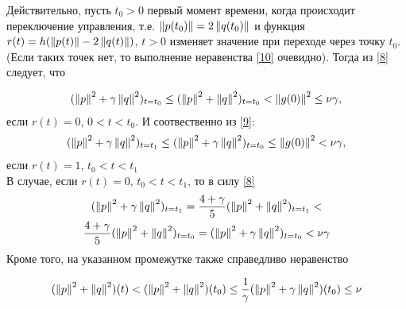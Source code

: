     Действительно, пусть $t_0 > 0$ первый момент времени, когда происходит
    переключение управления, т.е. $\left\lVert p(t_0)\right\rVert = 2\left\lVert q(t_0)\right\rVert$ и функция
    $r(t) = h(\left\lVert p(t)\right\rVert - 2 \left\lVert q(t)\right\rVert)$, $t > 0$ изменяет значение при
    переходе через точку $t_0$. (Если таких точек нет, то выполнение неравенства
    \eqref{10} очевидно). Тогда из \eqref{8} следует, что 
    
    \begin{gather*}
        (\left\lVert p\right\rVert^2 + \gamma \left\lVert q\right\rVert^2)_{t = t_0} \le (\left\lVert p\right\rVert^2 +
        \left\lVert q\right\rVert^2)_{t = t_0} < \left\lVert g(0)\right\rVert^2 \le \nu \gamma, 
    \end{gather*}
    если $r(t) = 0$, $0 < t < t_0$. И соотвественно из \eqref{9}:
    \begin{gather*}
        (\left\lVert p\right\rVert^2 + \gamma \left\lVert q\right\rVert^2)_{t=t_1} \le (\left\lVert p\right\rVert^2 + \gamma
        \left\lVert q\right\rVert^2)_{t=t_0} \le \left\lVert g(0)\right\rVert^2 < \nu \gamma,
    \end{gather*}
    если $r(t) = 1$, $t_0 < t < t_1$\\
    В случае, если $r(t) = 0$, $t_0 < t < t_1$, то в силу \eqref{8} 
    \begin{gather*}
        (\left\lVert p\right\rVert^2 + \gamma \left\lVert q\right\rVert^2)_{t=t_1} = \frac{4 +
        \gamma}{5}(\left\lVert p\right\rVert^2 + \left\lVert q\right\rVert^2)_{t = t_1} < \\*
        \frac{4 + \gamma}{5}(\left\lVert p\right\rVert^2 + \left\lVert q\right\rVert^2)_{t=t_0} = (\left\lVert p\right\rVert^2 +
        \gamma \left\lVert q\right\rVert^2)_{t=t_0} < \nu \gamma
    \end{gather*}
    Кроме того, на указанном промежутке также справедливо неравенство 

    \begin{equation}
        (\left\lVert p\right\rVert^2 + \left\lVert q\right\rVert^2)(t) < (\left\lVert p\right\rVert^2 + \left\lVert q\right\rVert^2)(t_0) \le
        \frac{1}{\gamma}(\left\lVert p\right\rVert^2 + \gamma \left\lVert q\right\rVert^2)(t_0) \le \nu
    \end{equation}
    
